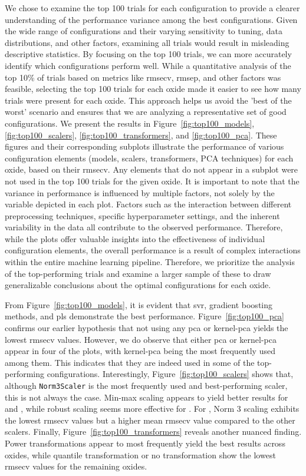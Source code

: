 We chose to examine the top 100 trials for each configuration to provide a clearer understanding of the performance variance among the best configurations.
Given the wide range of configurations and their varying sensitivity to tuning, data distributions, and other factors, examining all trials would result in misleading descriptive statistics.
By focusing on the top 100 trials, we can more accurately identify which configurations perform well.
While a quantitative analysis of the top 10\% of trials based on metrics like \gls{rmsecv}, \gls{rmsep}, and other factors was feasible, selecting the top 100 trials for each oxide made it easier to see how many trials were present for each oxide.
This approach helps us avoid the 'best of the worst' scenario and ensures that we are analyzing a representative set of good configurations.
We present the results in Figure~\ref{fig:top100_models}, \ref{fig:top100_scalers}, \ref{fig:top100_transformers}, and \ref{fig:top100_pca}.
These figures and their corresponding subplots illustrate the performance of various configuration elements (models, scalers, transformers, PCA techniques) for each oxide, based on their \gls{rmsecv}.
Any elements that do not appear in a subplot were not used in the top 100 trials for the given oxide.
It is important to note that the variance in performance is influenced by multiple factors, not solely by the variable depicted in each plot.
Factors such as the interaction between different preprocessing techniques, specific hyperparameter settings, and the inherent variability in the data all contribute to the observed performance.
Therefore, while the plots offer valuable insights into the effectiveness of individual configuration elements, the overall performance is a result of complex interactions within the entire machine learning pipeline.
Therefore, we prioritize the analysis of the top-performing trials and examine a larger sample of these to draw generalizable conclusions about the optimal configurations for each oxide.

From Figure~\ref{fig:top100_models}, it is evident that \gls{svr}, gradient boosting methods, and \gls{pls} demonstrate the best performance.
Figure~\ref{fig:top100_pca} confirms our earlier hypothesis that not using any \gls{pca} or \gls{kernel-pca} yields the lowest \gls{rmsecv} values.
However, we do observe that either \gls{pca} or \gls{kernel-pca} appear in four of the plots, with \gls{kernel-pca} being the most frequently used among them.
This indicates that they are indeed used in some of the top-performing configurations.
Interestingly, Figure~\ref{fig:top100_scalers} shows that, although \texttt{Norm3Scaler} is the most frequently used and best-performing scaler, this is not always the case.
Min-max scaling appears to yield better results for  and , while robust scaling seems more effective for .
For , Norm 3 scaling exhibits the lowest \gls{rmsecv} values but a higher mean \gls{rmsecv} value compared to the other scalers.
Finally, Figure~\ref{fig:top100_transformers} reveals another nuanced finding.
Power transformations appear to most frequently yield the best results across oxides, while quantile transformation or no transformation show the lowest \gls{rmsecv} values for the remaining oxides.

